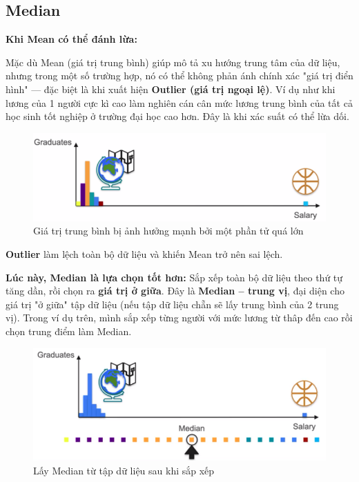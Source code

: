 \documentclass[11pt]{article}
\begin{document}
\subsection{Median}

\textbf{Khi Mean có thể đánh lừa:}

Mặc dù Mean (giá trị trung bình) giúp mô tả xu hướng trung tâm của dữ liệu, nhưng trong một số trường hợp, nó có thể không phản ánh chính xác "giá trị điển hình" — đặc biệt là khi xuất hiện \textbf{Outlier (giá trị ngoại lệ)}. Ví dụ như khi lương của 1 người cực kì cao làm nghiên cán cân mức lương trung bình của tất cả học sinh tốt nghiệp ở trường đại học cao hơn. Đây là khi xác suất có thể lừa dối. 

\begin{figure}[H]
    \centering
    \includegraphics[width=0.9\linewidth]{images/mean_salary_outlier_example.png}
    \caption{Giá trị trung bình bị ảnh hưởng mạnh bởi một phần tử quá lớn}
\end{figure}

\textbf{Outlier} làm lệch toàn bộ dữ liệu và khiến Mean trở nên sai lệch.

\vspace{1em}

\textbf{Lúc này, Median là lựa chọn tốt hơn:}
Sắp xếp toàn bộ dữ liệu theo thứ tự tăng dần, rồi chọn ra \textbf{giá trị ở giữa}. Đây là \textbf{Median – trung vị}, đại diện cho giá trị "ở giữa" tập dữ liệu (nếu tập dữ liệu chẵn sẽ lấy trung bình của 2 trung vị). Trong ví dụ trên, mình sắp xếp từng người với mức lương từ thâp đến cao rồi chọn trung điểm làm Median.

\begin{figure}[H]
    \centering
    \includegraphics[width=0.85\linewidth]{images/median_salary_outlier_example.png}
    \caption{Lấy Median từ tập dữ liệu sau khi sắp xếp}
\end{figure}
\end{document}
